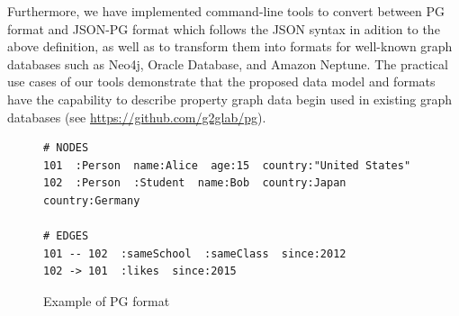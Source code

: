 \documentclass[runningheads]{llncs}
\begin{document}

Furthermore, we have implemented command-line tools to convert between PG format and JSON-PG format which follows the JSON syntax in adition to the above definition, as well as to transform them into formats for well-known graph databases such as Neo4j, Oracle Database, and Amazon Neptune. The practical use cases of our tools demonstrate that the proposed data model and formats have the capability to describe property graph data begin used in existing graph databases (see \url{https://github.com/g2glab/pg}).

\begin{figure}[!t]
\begin{scriptsize}
\begin{verbatim}
# NODES
101  :Person  name:Alice  age:15  country:"United States"
102  :Person  :Student  name:Bob  country:Japan  country:Germany

# EDGES
101 -- 102  :sameSchool  :sameClass  since:2012
102 -> 101  :likes  since:2015
\end{verbatim}
\end{scriptsize}
\caption{Example of PG format}
\label{fig:example-pg}
\end{figure}

\end{document}
